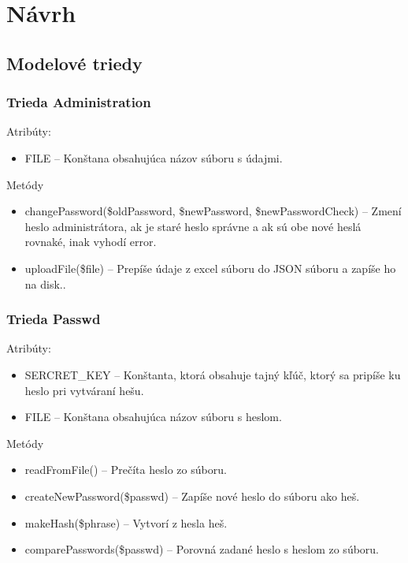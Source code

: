 \documentclass[12pt,a4paper]{report}
\begin{document}
\renewcommand{\chaptername}{}	
\chapter[Návrh]{\rmfamily\bfseries
	Návrh}

\section[Modelové triedy]{\rmfamily\bfseries
	Modelové triedy}

\subsection[Trieda Administration]{\rmfamily\bfseries
	Trieda Administration}
Atribúty:
\begin{itemize}
		\item FILE – Konštana obsahujúca názov súboru s údajmi. 
\end{itemize}
Metódy
\begin{itemize}
	\item changePassword(\$oldPassword, \$newPassword, \$newPasswordCheck) – Zmení heslo administrátora, ak je staré heslo správne a ak sú obe nové heslá rovnaké, inak vyhodí error.
	\item uploadFile(\$file) – Prepíše údaje z excel súboru do JSON súboru a zapíše ho na disk..
\end{itemize}

\subsection[Trieda Passwd]{\rmfamily\bfseries
	Trieda Passwd}
Atribúty:
\begin{itemize}
	\item SERCRET\_KEY – Konštanta, ktorá obsahuje tajný kľúč, ktorý sa pripíše ku heslo pri vytváraní hešu. 
	\item FILE – Konštana obsahujúca názov súboru s heslom.
\end{itemize}
Metódy
\begin{itemize}
	\item readFromFile() – Prečíta heslo zo súboru.
	\item createNewPassword(\$passwd) – Zapíše nové heslo do súboru ako heš.
	\item makeHash(\$phrase) – Vytvorí z hesla heš.
	\item comparePasswords(\$passwd) – Porovná zadané heslo s heslom zo súboru.
\end{itemize}
\end{document}
